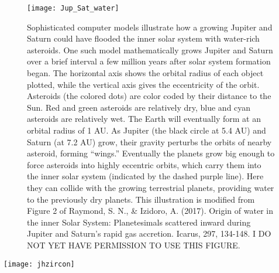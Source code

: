 {\newpage
\begin{figure}[p]
\centering
\texttt{[image: Jup\_Sat\_water]}%
\caption{Sophisticated computer models illustrate how a growing Jupiter and Saturn could have flooded the inner solar system with water-rich asteroids. One such model mathematically grows Jupiter and Saturn over a brief interval a few million years after solar system formation began. The horizontal axis shows the orbital radius of each object plotted, while the vertical axis gives the eccentricity of the orbit. Asteroids (the colored dots) are color coded by their distance to the Sun. Red and green asteroids are relatively dry, blue and cyan asteroids are relatively wet. The Earth will eventually form at an orbital radius of 1 AU. As Jupiter (the black circle at 5.4 AU) and Saturn (at 7.2 AU) grow, their gravity perturbs the orbits of nearby asteroid, forming ``wings.'' Eventually the planets grow big enough to force asteroids into highly eccentric orbits, which carry them into the inner solar system (indicated by the dashed purple line). Here they can collide with the growing terrestrial planets, providing water to the previously dry planets. This illustration is modified from Figure 2 of Raymond, S. N., \& Izidoro, A. (2017). Origin of water in the inner Solar System: Planetesimals scattered inward during Jupiter and Saturn's rapid gas accretion. Icarus, 297, 134-148. I DO NOT YET HAVE PERMISSION TO USE THIS FIGURE.}   
\label{fig:jupiter_source_water}
\end{figure}


\newpage
\begin{sidewaysfigure}[ht]
\centering
\texttt{[image: jhzircon]}%
\caption{The oldest bits of our planet known are found in an ancient part of western Australia (pane a). From space (b) the desolate Jack Hills region shows ~3 Ga sedimentary rocks that have repeatedly been heated an deformed. On the ground (c), the rocks include conglomerates clearly formed by and in running water, hardly surprising in such ``young'' rocks. Zircon grains (d) found in these rocks are substantially older than their host rocks: the lower left corner of the zircon here is \num[separate-uncertainty = true]{4.404(8)}. Oxygen isotope ratios in the zircon indicate that the rocks from which the zircon formed had interacted with liquid water. Earth's hydrosphere was up and running over 4.4 billion years ago. Pane (a) and (b) are courtesy of NASA Earth Observatory (https://earthobservatory.nasa.gov/Features/Zircon/Images/australia\_map.jpg; https://eoimages.gsfc.nasa.gov/images/imagerecords/6000/6331/jackhills\_etm\_1999208\_lrg.jpg). Panes (c; http://www.geology.wisc.edu/zircon/Earliest\%20Piece/Images/3.jpg) and (d; http://www.geology.wisc.edu/zircon/Earliest\%20Piece/Images/5.jpg) are from John Valley's web site, and I DO NOT YET HAVE PERMISSION TO USE THIS THEM. }   
\label{fig:jhzirc}
\end{sidewaysfigure}

}
